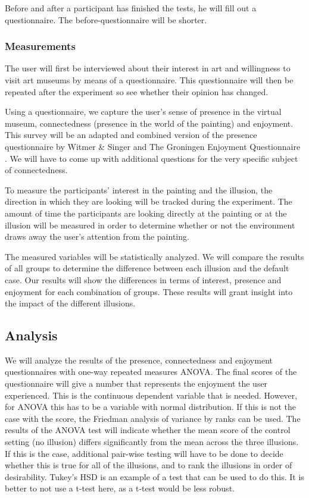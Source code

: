 \documentclass[a4paper]{article}
\begin{document}
Before and after a participant has finished the tests, he will fill out a questionnaire. The before-questionnaire will be shorter.

\subsubsection{Measurements}\label{sec:measurements}

The user will first be interviewed about their interest in art and willingness to visit art museums by means of a questionnaire. This questionnaire will then be repeated after the experiment so see whether their opinion has changed.

Using a questionnaire, we capture the user's sense of presence in the virtual museum, connectedness (presence in the world of the painting) and enjoyment. This survey will be an adapted and combined version of the presence questionnaire by Witmer \& Singer \cite{witmer} and The Groningen Enjoyment Questionnaire \cite{stevens}. We will have to come up with additional questions for the very specific subject of connectedness.

To measure the participants' interest in the painting and the illusion, the direction in which they are looking will be tracked during the experiment. The amount of time the participants are looking directly at the painting or at the illusion will be measured in order to determine whether or not the environment draws away the user's attention from the painting. 

The measured variables will be statistically analyzed. We will compare the results of all groups to determine the difference between each illusion and the default case. Our results will show the differences in terms of interest, presence and enjoyment for each combination of groups. These results will grant insight into the impact of the different illusions.


\subsection{Analysis}
We will analyze the results of the presence, connectedness and enjoyment questionnaires with one-way repeated measures ANOVA. The final scores of the questionnaire will give a number that represents the enjoyment the user experienced. This is the continuous dependent variable that is needed. However, for ANOVA this has to be a variable with normal distribution. If this is not the case with the score, the Friedman analysis of variance by ranks can be used. The results of the ANOVA test will indicate whether the mean score of the control setting (no illusion) differs significantly from the mean across the three illusions. If this is the case, additional pair-wise testing will have to be done to decide whether this is true for all of the illusions, and to rank the illusions in order of desirability. Tukey’s HSD is an example of a test that can be used to do this. It is better to not use a t-test here, as a t-test would be less robust.
\end{document}
